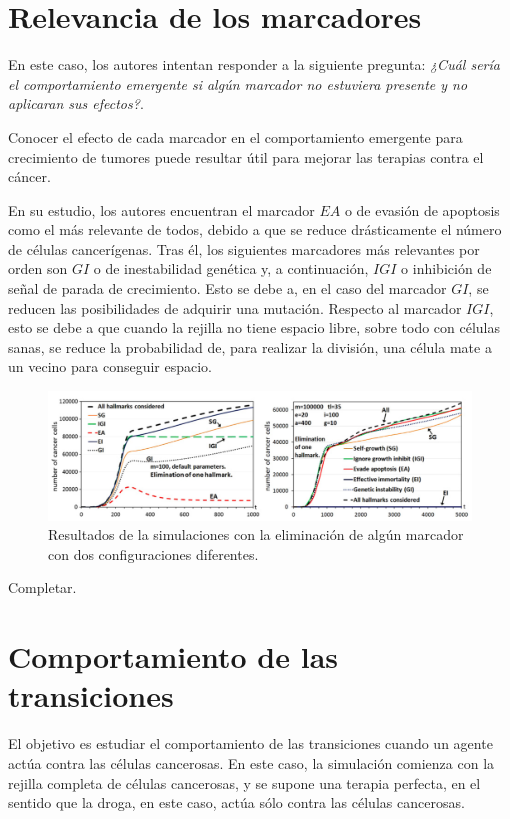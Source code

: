 \section{Relevancia de los marcadores}

En este caso, los autores intentan responder a la siguiente pregunta: \textit{¿Cuál sería
el comportamiento emergente si algún marcador no estuviera presente y no aplicaran
sus efectos?}.

Conocer el efecto de cada marcador en el comportamiento emergente para crecimiento de tumores
puede resultar útil para mejorar las terapias contra el cáncer.

En su estudio, los autores encuentran el marcador $EA$ o de evasión de apoptosis como el más
relevante de todos, debido a que se reduce drásticamente el número de células cancerígenas.
Tras él, los siguientes marcadores más relevantes por orden son $GI$ o de inestabilidad genética y,
a continuación, $IGI$ o inhibición de señal de parada de crecimiento. Esto se debe a, en el caso
del marcador $GI$, se reducen las posibilidades de adquirir una mutación. Respecto al marcador $IGI$,
esto se debe a que cuando la rejilla no tiene espacio libre, sobre todo con células sanas, se reduce
la probabilidad de, para realizar la división, una célula mate a un vecino para conseguir espacio.

\begin{figure}[h]
\centering
\includegraphics[scale=0.5]{figures/experiments/exp6}
\caption{Resultados de la simulaciones con la eliminación de algún marcador con dos configuraciones diferentes.}
\label{fig:exp6}
\end{figure}

Completar.

\section{Comportamiento de las transiciones}

El objetivo es estudiar el comportamiento de las transiciones cuando un agente actúa contra las células cancerosas.
En este caso, la simulación comienza con la rejilla completa de células cancerosas, y se supone una terapia
perfecta, en el sentido que la droga, en este caso, actúa sólo contra las células cancerosas.

